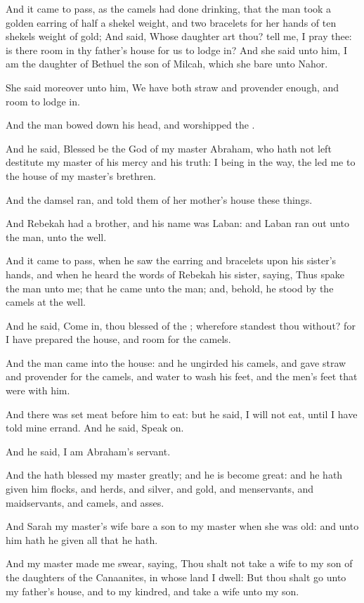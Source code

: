 \Verse And it came to pass, as the camels had done drinking, that the man took a golden earring of half a shekel weight, and two bracelets for her hands of ten shekels weight of gold; \Verse And said, Whose daughter art thou? tell me, I pray thee: is there room in thy father's house for us to lodge in?  \Verse And she said unto him, I am the daughter of Bethuel the son of Milcah, which she bare unto Nahor.

\Verse She said moreover unto him, We have both straw and provender enough, and room to lodge in.

\Verse And the man bowed down his head, and worshipped the \LORD.

\Verse And he said, Blessed be the \LORD God of my master Abraham, who hath not left destitute my master of his mercy and his truth: I being in the way, the \LORD led me to the house of my master's brethren.

\Verse And the damsel ran, and told them of her mother's house these things.

\Verse And Rebekah had a brother, and his name was Laban: and Laban ran out unto the man, unto the well.

\Verse And it came to pass, when he saw the earring and bracelets upon his sister's hands, and when he heard the words of Rebekah his sister, saying, Thus spake the man unto me; that he came unto the man; and, behold, he stood by the camels at the well.

\Verse And he said, Come in, thou blessed of the \LORD; wherefore standest thou without? for I have prepared the house, and room for the camels.

\Verse And the man came into the house: and he ungirded his camels, and gave straw and provender for the camels, and water to wash his feet, and the men's feet that were with him.

\Verse And there was set meat before him to eat: but he said, I will not eat, until I have told mine errand. And he said, Speak on.

\Verse And he said, I am Abraham's servant.

\Verse And the \LORD hath blessed my master greatly; and he is become great: and he hath given him flocks, and herds, and silver, and gold, and menservants, and maidservants, and camels, and asses.

\Verse And Sarah my master's wife bare a son to my master when she was old: and unto him hath he given all that he hath.

\Verse And my master made me swear, saying, Thou shalt not take a wife to my son of the daughters of the Canaanites, in whose land I dwell: \Verse But thou shalt go unto my father's house, and to my kindred, and take a wife unto my son.

